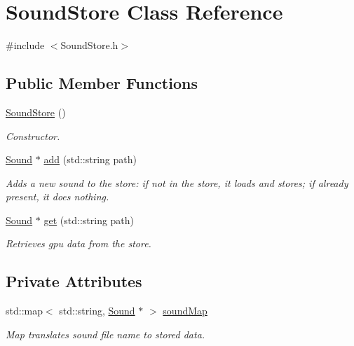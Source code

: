\hypertarget{class_sound_store}{}\section{Sound\+Store Class Reference}
\label{class_sound_store}


{\ttfamily \#include $<$Sound\+Store.\+h$>$}

\subsection*{Public Member Functions}
\begin{DoxyCompactItemize}
\item 
\hyperlink{class_sound_store_a14e85794e6633aa83dbab0b1cb72826a}{Sound\+Store} ()\hypertarget{class_sound_store_a14e85794e6633aa83dbab0b1cb72826a}{}\label{class_sound_store_a14e85794e6633aa83dbab0b1cb72826a}

\begin{DoxyCompactList}\small\item\em Constructor. \end{DoxyCompactList}\item 
\hyperlink{class_sound}{Sound} $\ast$ \hyperlink{class_sound_store_acad2fc70afd94cb00618e3bbea29976c}{add} (std\+::string path)
\begin{DoxyCompactList}\small\item\em Adds a new sound to the store\+: if not in the store, it loads and stores; if already present, it does nothing. \end{DoxyCompactList}\item 
\hyperlink{class_sound}{Sound} $\ast$ \hyperlink{class_sound_store_a5694dfe7d0a1d4d10b6a6aa6d7828a92}{get} (std\+::string path)
\begin{DoxyCompactList}\small\item\em Retrieves gpu data from the store. \end{DoxyCompactList}\end{DoxyCompactItemize}
\subsection*{Private Attributes}
\begin{DoxyCompactItemize}
\item 
std\+::map$<$ std\+::string, \hyperlink{class_sound}{Sound} $\ast$ $>$ \hyperlink{class_sound_store_a33cb077cb9c34febb095fc3a528db0a5}{sound\+Map}\hypertarget{class_sound_store_a33cb077cb9c34febb095fc3a528db0a5}{}\label{class_sound_store_a33cb077cb9c34febb095fc3a528db0a5}

\begin{DoxyCompactList}\small\item\em Map translates sound file name to stored data. \end{DoxyCompactList}\end{DoxyCompactItemize}


